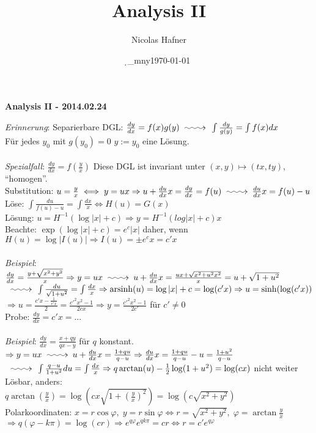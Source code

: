 \documentclass[12pt,a4paper,titlepage]{article}
\author{Nicolas Hafner}
\title{Analysis II}
\date{\d_mny\today}
\makeatletter
\newcommand{\longsquiggly}{\xymatrix{{}\ar@{~>}[r]&{}}}
\newcommand{\arsinh}{\operatorname{arsinh}}
\makeatother
\begin{document}
	
\begin{center}{\bfseries\Huge Analysis II - 2014.02.24}\end{center}
\textit{Erinnerung}: Separierbare DGL: $\frac{dy}{dx}=f(x)g(y) \longsquiggly \int\frac{dy}{g(y)}=\int f(x)dx$ \\
Für jedes $y_0$ mit $g(y_0)=0$ $y:=y_0$ eine Lösung.\\
\\
\textit{Spezialfall}: $\frac{dy}{dx}=f(\frac{y}{x})$ Diese DGL ist invariant unter $(x,y)\mapsto(tx,ty)$, ``homogen''. \\
Substitution: $u=\frac{y}{x} \iff y=ux \Rightarrow u+\frac{du}{dx}x=\frac{dy}{dx}=f(u) \longsquiggly \frac{du}{dx}x=f(u)-u$ \\
Löse: $\int\frac{du}{f(u)-u}=\int\frac{dx}{x}\iff H(u)=G(x)$ \\
Lösung: $u=H^{-1}(\log|x|+c) \Rightarrow y=H^{-1}(log|x|+c)x$ \\
Beachte: $\exp(\log|x|+c)=e^c|x|$ daher, wenn $H(u)=\log|I(u)| \Rightarrow I(u)=\pm e^cx=c'x$ \\
\\
\textit{Beispiel}: $\frac{dy}{dx}=\frac{y+\sqrt{x^2+y^2}}{x} \Rightarrow y=ux \longsquiggly u+\frac{du}{dx}x=\frac{ux+\sqrt{x^2+u^2x^2}}{x}=u+\sqrt{1+u^2}$ \\
$\longsquiggly \int\frac{du}{\sqrt{1+u^2}}=\int\frac{dx}{x} \Rightarrow \arsinh(u)=\log|x|+c=\log(c'x) \Rightarrow u=\sinh(\log(c'x))$ \\
$\Rightarrow u=\frac{c'x-\frac{1}{c'x}}{2}=\frac{c'^2x^2-1}{2cx} \Rightarrow y=\frac{c'^2x^2-1}{2c'}$ für $c'\neq0$ \\
Probe: $\frac{dy}{dx}=c'x=...$ \\
\\
\textit{Beispiel}: $\frac{dy}{dx}=\frac{x+qy}{qx-y}$ für $q$ konstant. $\Rightarrow y=ux \longsquiggly u+\frac{du}{dx}x=\frac{1+qu}{q-u} \Rightarrow \frac{du}{dx}x=\frac{1+qu}{q-u}-u=\frac{1+u^2}{q-u}$ \\
$\longsquiggly \int\frac{q-u}{1+u^2}du=\int\frac{dx}{x} \Rightarrow q\arctan(u)-\frac{1}{2}\log(1+u^2)=\log(cx)$ nicht weiter Lösbar, anders: \\
$q\arctan(\frac{y}{x})=\log\left(cx\sqrt{1+\left(\frac{y}{x}\right)^2}\right)=\log\left(c\sqrt{x^2+y^2}\right)$ \\
Polarkoordinaten: $x=r\cos\varphi,\; y=r\sin\varphi \iff r=\sqrt{x^2+y^2},\; \varphi=\arctan\frac{y}{x}$ \\
$\Rightarrow q(\varphi-k\pi)=\log(cr) \Rightarrow e^{q\varphi}e^{qk\pi}=cr \iff r=c'e^{q\varphi}$
\end{document}
